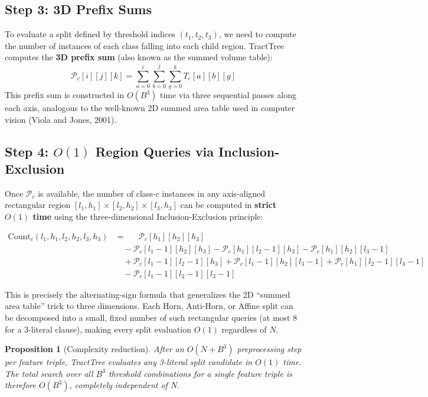 \documentclass[11pt,a4paper]{article}
\newtheorem{proposition}{Proposition}
\begin{document}
\subsection{Step 3: 3D Prefix Sums}

To evaluate a split defined by threshold indices $(t_1, t_2, t_3)$, we need to compute the number of instances of each class falling into each child region. TractTree computes the \textbf{3D prefix sum} (also known as the summed volume table):
$$
\mathcal{P}_c[i][j][k] = \sum_{a=0}^{i} \sum_{b=0}^{j} \sum_{g=0}^{k} T_c[a][b][g]
$$
This prefix sum is constructed in $O(B^3)$ time via three sequential passes along each axis, analogous to the well-known 2D summed area table used in computer vision (Viola and Jones, 2001).

\subsection{Step 4: $O(1)$ Region Queries via Inclusion-Exclusion}

Once $\mathcal{P}_c$ is available, the number of class-$c$ instances in any axis-aligned rectangular region $[l_1, h_1] \times [l_2, h_2] \times [l_3, h_3]$ can be computed in \textbf{strict $O(1)$ time} using the three-dimensional Inclusion-Exclusion principle:

\begin{align}
\mathrm{Count}_c(l_1, h_1, l_2, h_2, l_3, h_3) &= \phantom{+}\;\mathcal{P}_c[h_1][h_2][h_3] \nonumber \\
  &\quad - \mathcal{P}_c[l_1\!-\!1][h_2][h_3] - \mathcal{P}_c[h_1][l_2\!-\!1][h_3] - \mathcal{P}_c[h_1][h_2][l_3\!-\!1] \nonumber \\
  &\quad + \mathcal{P}_c[l_1\!-\!1][l_2\!-\!1][h_3] + \mathcal{P}_c[l_1\!-\!1][h_2][l_3\!-\!1] + \mathcal{P}_c[h_1][l_2\!-\!1][l_3\!-\!1] \nonumber \\
  &\quad - \mathcal{P}_c[l_1\!-\!1][l_2\!-\!1][l_3\!-\!1]
  \label{eq:incl_excl}
\end{align}

This is precisely the alternating-sign formula that generalizes the 2D ``summed area table'' trick to three dimensions. Each Horn, Anti-Horn, or Affine split can be decomposed into a small, fixed number of such rectangular queries (at most 8 for a 3-literal clause), making every split evaluation $O(1)$ regardless of $N$.

\begin{proposition}[Complexity reduction]
After an $O(N + B^3)$ preprocessing step per feature triple, TractTree evaluates any 3-literal split candidate in $O(1)$ time. The total search over all $B^3$ threshold combinations for a single feature triple is therefore $O(B^3)$, completely independent of $N$.
\end{proposition}
\end{document}
